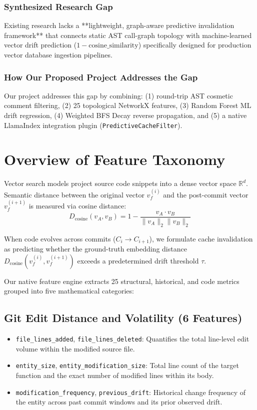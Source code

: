 \documentclass[conference]{IEEEtran}
\begin{document}
\subsubsection{Synthesized Research Gap}
Existing research lacks a **lightweight, graph-aware predictive invalidation framework** that connects static AST call-graph topology with machine-learned vector drift prediction ($1 - \text{cosine\_similarity}$) specifically designed for production vector database ingestion pipelines.

\subsubsection{How Our Proposed Project Addresses the Gap}
Our project addresses this gap by combining: (1) round-trip AST cosmetic comment filtering, (2) 25 topological NetworkX features, (3) Random Forest ML drift regression, (4) Weighted BFS Decay reverse propagation, and (5) a native LlamaIndex integration plugin (\texttt{PredictiveCacheFilter}).

\section{Overview of Feature Taxonomy}

Vector search models project source code snippets into a dense vector space $\mathbb{R}^d$. Semantic distance between the original vector $v_f^{(i)}$ and the post-commit vector $v_f^{(i+1)}$ is measured via cosine distance:
\begin{equation}
D_{\text{cosine}}(v_A, v_B) = 1 - \frac{v_A \cdot v_B}{\|v_A\|_2 \|v_B\|_2}
\end{equation}

When code evolves across commits ($C_i \to C_{i+1}$), we formulate cache invalidation as predicting whether the ground-truth embedding distance $D_{\text{cosine}}(v_f^{(i)}, v_f^{(i+1)})$ exceeds a predetermined drift threshold $\tau$.

Our native feature engine extracts 25 structural, historical, and code metrics grouped into five mathematical categories:

\subsection{Git Edit Distance and Volatility (6 Features)}
\begin{itemize}
    \item \texttt{file\_lines\_added}, \texttt{file\_lines\_deleted}: Quantifies the total line-level edit volume within the modified source file.
    \item \texttt{entity\_size}, \texttt{entity\_modification\_size}: Total line count of the target function and the exact number of modified lines within its body.
    \item \texttt{modification\_frequency}, \texttt{previous\_drift}: Historical change frequency of the entity across past commit windows and its prior observed drift.
\end{itemize}
\end{document}
